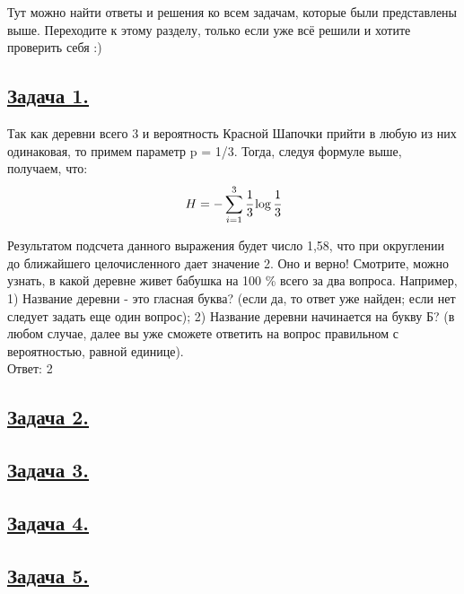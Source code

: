 Тут можно найти ответы и решения ко всем задачам, которые были представлены выше. Переходите к этому разделу, только если уже всё решили и хотите проверить себя :)

\subsection*{\hyperref[sec:problem1]{Задача 1.}}
\label{sec:sol_problem1}
Так как деревни всего 3 и вероятность Красной Шапочки прийти в любую из них одинаковая, то примем параметр p = 1/3. Тогда, следуя формуле выше, получаем, что:
\[H=-\sum\limits_{i=1}^3 \cfrac{1}{3}\log \cfrac{1}{3} \]

Результатом подсчета данного выражения будет число 1,58, что при округлении до ближайшего целочисленного дает значение 2. Оно и верно! Смотрите, можно узнать, в какой деревне живет бабушка на 100 \%  всего за два вопроса. 
Например, 1) Название деревни - это гласная буква? (если да, то ответ уже найден; если нет следует задать еще один вопрос); 2) Название деревни начинается на букву Б? (в любом случае, далее вы уже сможете ответить на вопрос правильном с вероятностью, равной единице). \\

Ответ: 2
\subsection*{\hyperref[sec:problem2]{Задача 2.}}
\label{sec:sol_problem2}

\subsection*{\hyperref[sec:problem3]{Задача 3.}}
\label{sec:sol_problem3}

\subsection*{\hyperref[sec:problem4]{Задача 4.}}
\label{sec:sol_problem4}

\subsection*{\hyperref[sec:problem5]{Задача 5.}}
\label{sec:sol_problem5}